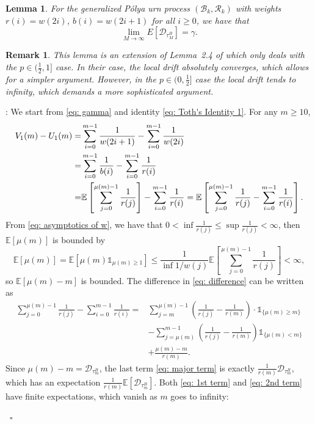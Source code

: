 \documentclass[twoside,12pt,a4paper]{article}
\newtheorem{lemma}{Lemma}[section]
\newtheorem{remark}{Remark}[section]
\numberwithin{equation}{section}
\newenvironment{proof}[1][Proof]{{\sc #1}:}{~\hfill $\square$}
\begin{document}
		\begin{lemma} \label{lm: convergence of mean of discrepancies}
			For the generalized P\'{o}lya urn process $(\mathcal{B}_{k},\mathcal{R}_{k})$ with weights $r(i)= w(2i)$, $b(i) = w(2i+1)$ for all $i\geq 0$, we have that
			$$
			\lim_{M\to\infty} E[\mathcal{D}_{\tau_M^B}] = \gamma. 
			$$
		\end{lemma} 
		\begin{remark}
			This lemma is an extension of Lemma~2.4 of \cite{KMP22} which only deals with the $p \in (\frac{1}{2}, 1]$ case. In their case, the local drift absolutely converges, which allows for a simpler argument. However, in the $p \in (0,\frac{1}{2}]$ case the local drift tends to infinity, which demands a more sophisticated argument.
		\end{remark}
		\begin{proof} 
			We start from \eqref{eq: gamma} and identity \eqref{eq: Toth's Identity 1}. For any $m \geq 10$,
			\begin{align}
				V_1(m) - U_1(m) =& \sum_{i=0}^{m-1} \frac{1}{w(2i+1)} -\sum_{i=0}^{m-1} \frac{1}{w(2i)} 
				\notag \\
				=& \sum_{i=0}^{m-1} \frac{1}{b(i)} -\sum_{i=0}^{m-1} \frac{1}{r(i)} 
				\notag \\
				=& 	\mathbb{E}\left[  \sum_{j=0}^{ \mu(m)-1 } \frac{1}{r(j)}   \right] - \sum_{i=0}^{m-1} \frac{1}{r(i)} = \mathbb{E}\left[  \sum_{j=0}^{ \mu(m)-1 } \frac{1}{r(j)}    - \sum_{i=0}^{m-1} \frac{1}{r(i)}\right]. \label{eq: difference}
			\end{align}
			From \eqref{eq: asymptotics of w}, we have that $0< \inf \frac{1}{r(j)} \leq \sup \frac{1}{r(j)} <\infty $, then $\mathbb{E}\left[\mu(m)\right]$ is bounded by
			$$\mathbb{E}\left[ \mu(m) \right] = \mathbb{E}\left[ \mu(m)\mathbb{1}_{\mu(m)\geq 1} \right] \leq  \frac{1}{\inf 1/w(j) }\mathbb{E}\left[  \sum_{j=0}^{ \mu(m)-1 } \frac{1}{r(j)}   \right] <\infty, $$ 
			so $ \mathbb{E}\left[ \mu(m) -m\right]  $ is bounded.
			The difference in \eqref{eq: difference} can be written as
			\begin{align} 
				\sum_{j=0}^{ \mu(m)-1 } \frac{1}{r(j)} - \sum_{i=0}^{m-1} \frac{1}{r(i)} =& \sum_{j=m}^{\mu(m)-1} \left(\frac{1}{r(j)} -\frac{1}{r(m)} \right) \cdot\mathbb{1}_{\{\mu(m)\geq m\}} 
				\label{eq: 1st term}
				\\	
				& - \sum_{j=\mu(m)}^{m-1} \left(\frac{1}{r(j)} -\frac{1}{r(m)} \right) \mathbb{1}_{\{\mu(m)< m\}} 
				\label{eq: 2nd term}
				\\
				& + \frac{\mu(m)-m}{ r(m) }. \label{eq: major term}
			\end{align} 
			Since $\mu(m)-m =  \mathcal{D}_{\tau^B_m}$, the last term \eqref{eq: major term} is exactly $\frac{1}{r(m)} \mathcal{D}_{\tau^B_m}$, which has an expectation $\frac{1}{r(m)} \mathbb{E}\left[\mathcal{D}_{\tau^B_m}\right].$ Both \eqref{eq: 1st term} and \eqref{eq: 2nd term} have finite expectations, which vanish as $m$ goes to infinity:
			

\end{proof}
\end{document}
